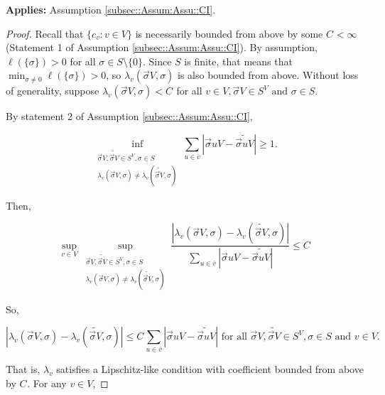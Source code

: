 \documentclass[12pt]{article}
\newcommand{\ov}{\overline}
\newcommand{\te}{\text}
\newcommand{\app}{\textbf{Applies: }}
\newcommand{\ind}{\hspace{24pt}}
\renewcommand{\v}{v}							%
\newcommand{\vv}{u}								%
\renewcommand{\S}{S}							%
\newcommand{\s}{\sigma}							%
\newcommand{\sv}{\vec{\s}}						%
\newcommand{\cl}{\ov}							%
\newcommand{\V}{V}									%
\newcommand{\XState}[1]{\S^{#1}}				%
\newcommand{\IGr}[1]{c_{#1}}						%
\newcommand{\rate}[1]{\lambda_{#1}}					%
\newcommand{\const}[1]{C_{#1}}						%
\newcommand{\Sm}{\ell}								%
\newcommand{\alt}{\widetilde}						%
\begin{document}
\app Assumption \ref{subsec::Assum:Assu::CI}.

\begin{proof}
Recall that \(\{\IGr{\v}:\v\in\V\}\) is necessarily bounded from above by some \(\const{} < \infty\) (Statement 1 of Assumption \ref{subsec::Assum:Assu::CI}). By assumption, \(\Sm(\{\s\}) > 0\) for all \(\s \in \S\setminus \{0\}\). Since \(\S\) is finite, that means that \(\min_{\s \neq 0} \Sm(\{\s\}) > 0\), so \(\rate{\v}(\sv{}{\V},\s)\) is also bounded from above. Without loss of generality, suppose \(\rate{\v}(\sv{}{\V},\s) < \const{}\) for all \(\v\in \V,\sv{}{\V} \in \S^\V\te{ and } \s \in \S\).

\ind By statement 2 of Assumption \ref{subsec::Assum:Assu::CI}, 

\[\inf_{\substack{\sv{}{\V},\alt{\sv{}{\V}} \in \S^\V, \s\in \S\\ \rate{\v}(\sv{}{\V},\s) \neq \rate{\v}(\alt{\sv{}{\V}},\s)}} \sum_{\vv \in \cl{\v}} |\sv{\vv}{\V} - \alt{\sv{\vv}{\V}}| \geq 1.\]

Then,

\[\sup_{\v\in \V} \sup_{\substack{\sv{}{\V},\alt{\sv{}{\V}} \in \S^\V, \s\in \S\\ \rate{\v}(\sv{}{\V},\s) \neq \rate{\v}(\alt{\sv{}{\V}},\s)}} \frac{|\rate{\v}(\sv{}{\V},\s) - \rate{\v}(\alt{\sv{}{\V}},\s)|}{\sum_{\vv \in \cl{\v}} |\sv{\vv}{\V} - \alt{\sv{\vv}{\V}}|} \leq \const{}\]

So,

\[|\rate{\v}(\sv{}{\V},\s) - \rate{\v}(\alt{\sv{}{\V}},\s)|\leq \const{}\sum_{\vv \in \cl{\v}} |\sv{\vv}{\V} - \alt{\sv{\vv}{\V}}| \te{ for all } \sv{}{\V},\alt{\sv{}{\V}}\in \S^\V,\s\in \S\te{ and }\v\in \V.\]

That is, \(\rate{\v}\) satisfies a Lipschitz-like condition with coefficient bounded from above by \(\const{}\). For any \(\v\in \V\),


\end{proof}
\end{document}
